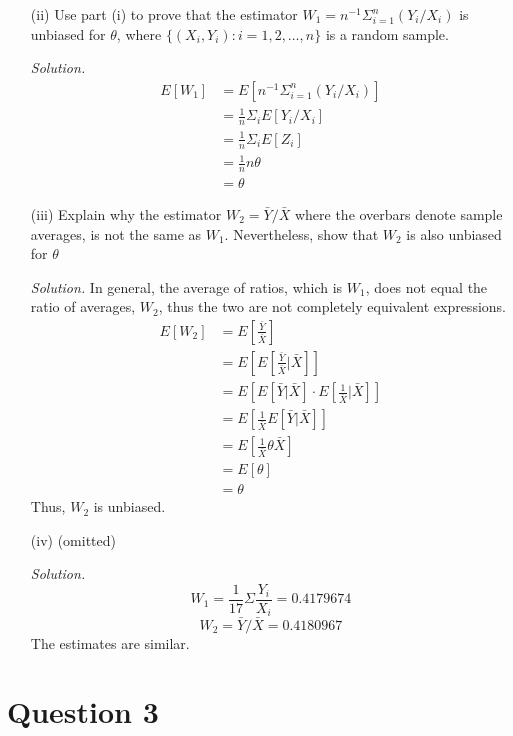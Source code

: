 \documentclass[
]{article}
\begin{document}
\begin{enumerate}
\begin{enumerate}
\item[(ii)] Use part (i) to prove that the estimator $W_1 = n^{-1} \Sigma ^n _{i = 1} (Y_i/X_i)$ is unbiased for $\theta$, where $\{(X_i, Y_i):i = 1, 2, \dots, n\}$ is a random sample.  
  
\textit{Solution.}
\[\begin{aligned}
E[W_1] &= E[n^{-1} \Sigma ^n _{i = 1} (Y_i/X_i)] \\
&= \frac{1}{n}\Sigma_i E[Y_i/X_i] \\
&= \frac{1}{n}\Sigma_i E[Z_i] \\
&= \frac{1}{n} n \theta \\
&= \theta
\end{aligned}\] 

\item[(iii)] Explain why the estimator $W_2 = \bar{Y} / \bar{X}$ where the overbars denote sample averages, is not the same as $W_1$. Nevertheless, show that $W_2$ is also unbiased for $\theta$  
  
\textit{Solution.} 
In general, the average of ratios, which is $W_1$, does not equal the ratio of averages, $W_2$, thus the two are not completely equivalent expressions.  
\[\begin{aligned}
E[W_2] &= E[\frac{\bar{Y}}{\bar{X}}] \\
&= E[E[\frac{\bar{Y}}{\bar{X}}|\bar{X}]] \\
&= E[E[\bar{Y}|\bar{X}] \cdot E[\frac{1}{\bar{X}}|\bar{X}]] \\ 
&= E[\frac{1}{\bar{X}} E[\bar{Y}|\bar{X}]] \\
&= E[\frac{1}{\bar{X}} \theta \bar{X}] \\
&= E[\theta] \\
&= \theta
\end{aligned}\]
Thus, $W_2$ is unbiased.  

\item[(iv)] (omitted)  

\textit{Solution.} 
\[W_1 = \frac{1}{17} \Sigma \frac{Y_i}{X_i} = 0.4179674\]
\[W_2 = \bar{Y} / \bar{X} = 0.4180967 \]
The estimates are similar.
  
\end{enumerate}
\end{enumerate}

\hypertarget{question-3}{%
\section{Question 3}\label{question-3}}
\end{document}
